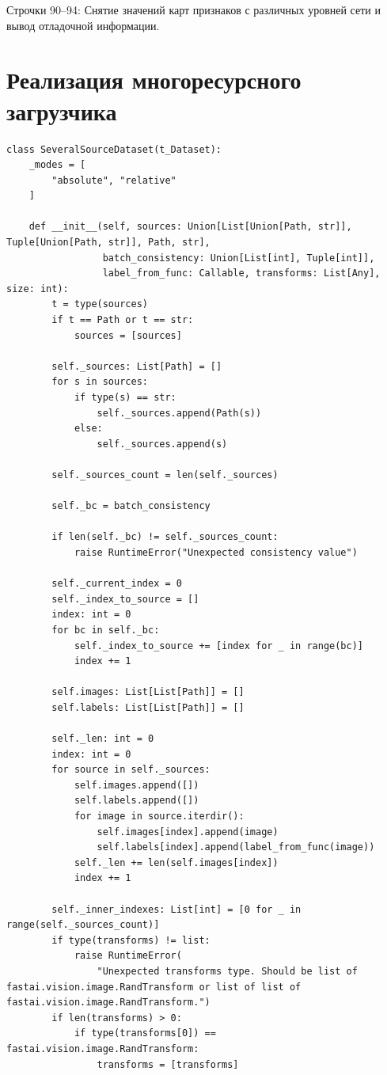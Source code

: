 Строчки 90--94: Снятие значений карт признаков с различных уровней сети и вывод отладочной информации.

\section{Реализация многоресурсного загрузчика}

\begin{lstlisting}[python]
    class SeveralSourceDataset(t_Dataset):
    _modes = [
        "absolute", "relative"
    ]

    def __init__(self, sources: Union[List[Union[Path, str]], Tuple[Union[Path, str]], Path, str],
                 batch_consistency: Union[List[int], Tuple[int]],
                 label_from_func: Callable, transforms: List[Any], size: int):
        t = type(sources)
        if t == Path or t == str:
            sources = [sources]

        self._sources: List[Path] = []
        for s in sources:
            if type(s) == str:
                self._sources.append(Path(s))
            else:
                self._sources.append(s)

        self._sources_count = len(self._sources)

        self._bc = batch_consistency

        if len(self._bc) != self._sources_count:
            raise RuntimeError("Unexpected consistency value")

        self._current_index = 0
        self._index_to_source = []
        index: int = 0
        for bc in self._bc:
            self._index_to_source += [index for _ in range(bc)]
            index += 1

        self.images: List[List[Path]] = []
        self.labels: List[List[Path]] = []

        self._len: int = 0
        index: int = 0
        for source in self._sources:
            self.images.append([])
            self.labels.append([])
            for image in source.iterdir():
                self.images[index].append(image)
                self.labels[index].append(label_from_func(image))
            self._len += len(self.images[index])
            index += 1

        self._inner_indexes: List[int] = [0 for _ in range(self._sources_count)]
        if type(transforms) != list:
            raise RuntimeError(
                "Unexpected transforms type. Should be list of fastai.vision.image.RandTransform or list of list of fastai.vision.image.RandTransform.")
        if len(transforms) > 0:
            if type(transforms[0]) == fastai.vision.image.RandTransform:
                transforms = [transforms]


\end{lstlisting}
